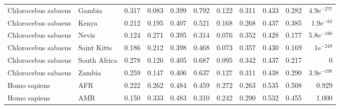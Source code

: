 \begin{longtable}{llrrrrrrrrr}
 Chlorocebus sabaeus &                    Gambia &                              0.317 &                               0.083 &                 0.399 &                 0.792 &                              0.122 &                               0.311 &                 0.433 &                 0.282 & 4.9e$^{-277}$ \\
 Chlorocebus sabaeus &                     Kenya &                              0.212 &                               0.195 &                 0.407 &                 0.521 &                              0.168 &                               0.268 &                 0.437 &                 0.385 &  1.9e$^{-83}$ \\
 Chlorocebus sabaeus &                     Nevis &                              0.124 &                               0.271 &                 0.395 &                 0.314 &                              0.076 &                               0.352 &                 0.428 &                 0.177 & 5.8e$^{-180}$ \\
 Chlorocebus sabaeus &               Saint Kitts &                              0.186 &                               0.212 &                 0.398 &                 0.468 &                              0.073 &                               0.357 &                 0.430 &                 0.169 &   1e$^{-249}$ \\
 Chlorocebus sabaeus &              South Africa &                              0.278 &                               0.126 &                 0.405 &                 0.687 &                              0.095 &                               0.342 &                 0.437 &                 0.217 &             0 \\
 Chlorocebus sabaeus &                    Zambia &                              0.259 &                               0.147 &                 0.406 &                 0.637 &                              0.127 &                               0.311 &                 0.438 &                 0.290 & 3.9e$^{-198}$ \\
        Homo sapiens &                       AFR &                              0.222 &                               0.262 &                 0.484 &                 0.459 &                              0.272 &                               0.263 &                 0.535 &                 0.508 &         0.929 \\
        Homo sapiens &                       AMR &                              0.150 &                               0.333 &                 0.483 &                 0.310 &                              0.242 &                               0.290 &                 0.532 &                 0.455 &         1.000 \\

\end{longtable}

